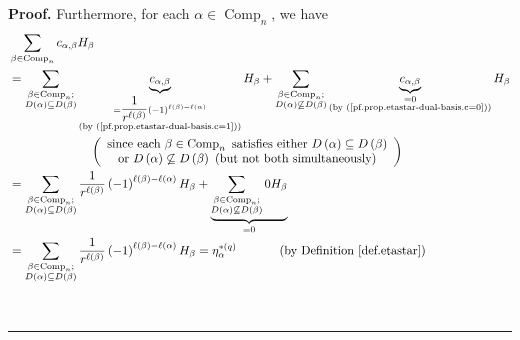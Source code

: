 \documentclass[numbers=enddot,12pt,final,onecolumn,notitlepage]{scrartcl}%
\theoremstyle{definition}
\newenvironment{proof}[1][Proof]{\noindent\textbf{#1.} }{\ \rule{0.5em}{0.5em}}
\let\sumnonlimits\sum
\renewcommand{\sum}{\sumnonlimits\limits}
\newenvironment{verlong}{}{}
\begin{document}
\begin{proof}
\begin{verlong}
Furthermore, for each $\alpha\in\operatorname*{Comp}\nolimits_{n}$, we have%
\begin{align*}
&  \sum_{\beta\in\operatorname*{Comp}\nolimits_{n}}c_{\alpha,\beta}H_{\beta}\\
&  =\sum_{\substack{\beta\in\operatorname*{Comp}\nolimits_{n};\\D\left(
\alpha\right)  \subseteq D\left(  \beta\right)  }}\underbrace{c_{\alpha,\beta
}}_{\substack{=\dfrac{1}{r^{\ell\left(  \beta\right)  }}\left(  -1\right)
^{\ell\left(  \beta\right)  -\ell\left(  \alpha\right)  }\\\text{(by
(\ref{pf.prop.etastar-dual-basis.c=1}))}}}H_{\beta}+\sum_{\substack{\beta
\in\operatorname*{Comp}\nolimits_{n};\\D\left(  \alpha\right)  \not \subseteq
D\left(  \beta\right)  }}\underbrace{c_{\alpha,\beta}}%
_{\substack{=0\\\text{(by (\ref{pf.prop.etastar-dual-basis.c=0}))}}}H_{\beta
}\\
&  \ \ \ \ \ \ \ \ \ \ \ \ \ \ \ \ \ \ \ \ \left(
\begin{array}
[c]{c}%
\text{since each }\beta\in\operatorname*{Comp}\nolimits_{n}\text{ satisfies
either }D\left(  \alpha\right)  \subseteq D\left(  \beta\right) \\
\text{or }D\left(  \alpha\right)  \not \subseteq D\left(  \beta\right)  \text{
(but not both simultaneously)}%
\end{array}
\right) \\
&  =\sum_{\substack{\beta\in\operatorname*{Comp}\nolimits_{n};\\D\left(
\alpha\right)  \subseteq D\left(  \beta\right)  }}\dfrac{1}{r^{\ell\left(
\beta\right)  }}\left(  -1\right)  ^{\ell\left(  \beta\right)  -\ell\left(
\alpha\right)  }H_{\beta}+\underbrace{\sum_{\substack{\beta\in
\operatorname*{Comp}\nolimits_{n};\\D\left(  \alpha\right)  \not \subseteq
D\left(  \beta\right)  }}0H_{\beta}}_{=0}\\
&  =\sum_{\substack{\beta\in\operatorname*{Comp}\nolimits_{n};\\D\left(
\alpha\right)  \subseteq D\left(  \beta\right)  }}\dfrac{1}{r^{\ell\left(
\beta\right)  }}\left(  -1\right)  ^{\ell\left(  \beta\right)  -\ell\left(
\alpha\right)  }H_{\beta}=\eta_{\alpha}^{\ast\left(  q\right)  }%
\ \ \ \ \ \ \ \ \ \ \left(  \text{by Definition \ref{def.etastar}}\right)
\end{align*}


\end{verlong}
\end{proof}
\end{document}
